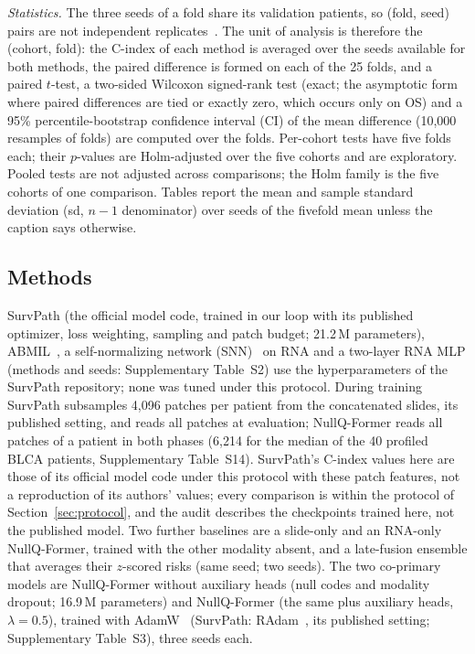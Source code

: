 \documentclass[journal]{IEEEtran}
\newcommand{\pq}{NullQ-Former}
\newcommand{\cindex}{C-index}
\begin{document}
\textit{Statistics.} The three seeds of a fold share its validation patients, so (fold, seed) pairs are not independent replicates~\cite{nadeau2003inference}. The unit of analysis is therefore the (cohort, fold): the \cindex{} of each method is averaged over the seeds available for both methods, the paired difference is formed on each of the 25 folds, and a paired $t$-test, a two-sided Wilcoxon signed-rank test (exact; the asymptotic form where paired differences are tied or exactly zero, which occurs only on OS) and a 95\% percentile-bootstrap confidence interval (CI) of the mean difference (10,000 resamples of folds) are computed over the folds. Per-cohort tests have five folds each; their $p$-values are Holm-adjusted over the five cohorts and are exploratory. Pooled tests are not adjusted across comparisons; the Holm family is the five cohorts of one comparison. Tables report the mean and sample standard deviation (sd, $n-1$ denominator) over seeds of the fivefold mean unless the caption says otherwise.

\subsection{Methods}
\label{sec:methods}
SurvPath (the official model code, trained in our loop with its published optimizer, loss weighting, sampling and patch budget; 21.2\,M parameters), ABMIL~\cite{ilse2018abmil}, a self-normalizing network (SNN)~\cite{klambauer2017self} on RNA and a two-layer RNA MLP (methods and seeds: Supplementary Table~S2) use the hyperparameters of the SurvPath repository; none was tuned under this protocol. During training SurvPath subsamples 4,096 patches per patient from the concatenated slides, its published setting, and reads all patches at evaluation; \pq{} reads all patches of a patient in both phases (6,214 for the median of the 40 profiled BLCA patients, Supplementary Table~S14). SurvPath's \cindex{} values here are those of its official model code under this protocol with these patch features, not a reproduction of its authors' values; every comparison is within the protocol of Section~\ref{sec:protocol}, and the audit describes the checkpoints trained here, not the published model. Two further baselines are a slide-only and an RNA-only \pq{}, trained with the other modality absent, and a late-fusion ensemble that averages their $z$-scored risks (same seed; two seeds). The two co-primary models are \pq{} without auxiliary heads (null codes and modality dropout; 16.9\,M parameters) and \pq{} (the same plus auxiliary heads, $\lambda = 0.5$), trained with AdamW~\cite{loshchilov2019adamw} (SurvPath: RAdam~\cite{liu2020variance}, its published setting; Supplementary Table~S3), three seeds each.
\end{document}
